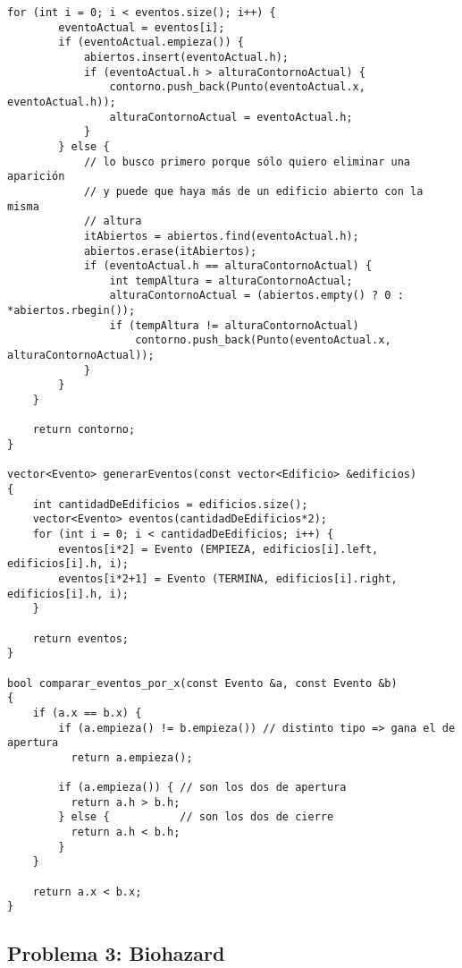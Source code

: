 \begin{lstlisting}[frame=single]
    for (int i = 0; i < eventos.size(); i++) {
        eventoActual = eventos[i];
        if (eventoActual.empieza()) {
            abiertos.insert(eventoActual.h);
            if (eventoActual.h > alturaContornoActual) {
                contorno.push_back(Punto(eventoActual.x, eventoActual.h));
                alturaContornoActual = eventoActual.h;
            }
        } else {
            // lo busco primero porque sólo quiero eliminar una aparición
            // y puede que haya más de un edificio abierto con la misma
            // altura
            itAbiertos = abiertos.find(eventoActual.h); 
            abiertos.erase(itAbiertos);
            if (eventoActual.h == alturaContornoActual) {
                int tempAltura = alturaContornoActual;
                alturaContornoActual = (abiertos.empty() ? 0 : *abiertos.rbegin());
                if (tempAltura != alturaContornoActual)
                    contorno.push_back(Punto(eventoActual.x, alturaContornoActual));
            }
        }
    }
    
    return contorno; 
} 

vector<Evento> generarEventos(const vector<Edificio> &edificios)
{
    int cantidadDeEdificios = edificios.size();
    vector<Evento> eventos(cantidadDeEdificios*2);
    for (int i = 0; i < cantidadDeEdificios; i++) {
        eventos[i*2] = Evento (EMPIEZA, edificios[i].left, edificios[i].h, i);
        eventos[i*2+1] = Evento (TERMINA, edificios[i].right, edificios[i].h, i);
    }
    
    return eventos;
}

bool comparar_eventos_por_x(const Evento &a, const Evento &b)
{
    if (a.x == b.x) {
        if (a.empieza() != b.empieza()) // distinto tipo => gana el de apertura
          return a.empieza();

        if (a.empieza()) { // son los dos de apertura
          return a.h > b.h;
        } else {           // son los dos de cierre
          return a.h < b.h;
        }
    }
    
    return a.x < b.x;
}
\end{lstlisting}

\subsection{Problema 3: Biohazard}

